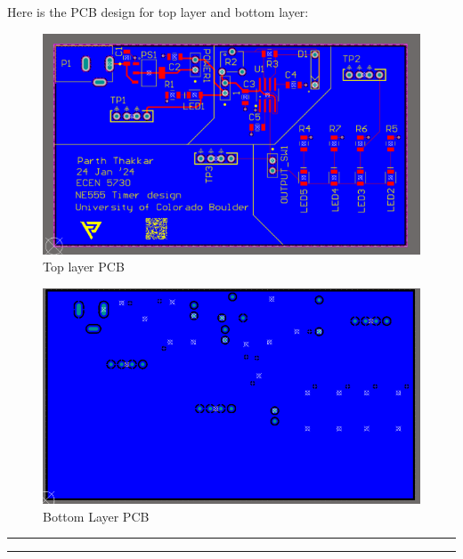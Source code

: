 \documentclass[a4paper,11pt]{article}%
\begin{document}
Here is the PCB design for top layer and bottom layer:

\begin{figure}[H]
	\centering
	\includegraphics[scale=0.8]{figures/top.png}
	\caption{Top layer PCB}
	\label{top}
\end{figure}

\begin{figure}[H]
	\centering
	\includegraphics[scale=0.8]{figures/bottom.png}
	\caption{Bottom Layer PCB}
	\label{bottom}
\end{figure}



\vfill
\hrule
\vspace{0.5cm}



\vspace{1cm}
\hrule
\vspace{0.5cm}


\end{document}
